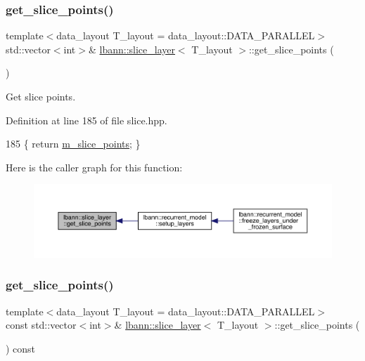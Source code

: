 \subsubsection{\texorpdfstring{get\+\_\+slice\+\_\+points()}{get\_slice\_points()}\hspace{0.1cm}{\footnotesize\ttfamily [1/2]}}
{\footnotesize\ttfamily template$<$data\+\_\+layout T\+\_\+layout = data\+\_\+layout\+::\+D\+A\+T\+A\+\_\+\+P\+A\+R\+A\+L\+L\+EL$>$ \\
std\+::vector$<$int$>$\& \hyperlink{classlbann_1_1slice__layer}{lbann\+::slice\+\_\+layer}$<$ T\+\_\+layout $>$\+::get\+\_\+slice\+\_\+points (\begin{DoxyParamCaption}{ }\end{DoxyParamCaption})\hspace{0.3cm}{\ttfamily [inline]}}

Get slice points. 

Definition at line 185 of file slice.\+hpp.


\begin{DoxyCode}
185 \{ \textcolor{keywordflow}{return} \hyperlink{classlbann_1_1slice__layer_af79dab13a70da2e81209e7ae15166e30}{m\_slice\_points}; \}
\end{DoxyCode}
Here is the caller graph for this function\+:\nopagebreak
\begin{figure}[H]
\begin{center}
\leavevmode
\includegraphics[width=350pt]{classlbann_1_1slice__layer_a5c02b2a15355be051f93e72f3b2803ce_icgraph}
\end{center}
\end{figure}
\mbox{\label{classlbann_1_1slice__layer_a88936fbabd04b06be6cf732fc5b73317}} 
\subsubsection{\texorpdfstring{get\+\_\+slice\+\_\+points()}{get\_slice\_points()}\hspace{0.1cm}{\footnotesize\ttfamily [2/2]}}
{\footnotesize\ttfamily template$<$data\+\_\+layout T\+\_\+layout = data\+\_\+layout\+::\+D\+A\+T\+A\+\_\+\+P\+A\+R\+A\+L\+L\+EL$>$ \\
const std\+::vector$<$int$>$\& \hyperlink{classlbann_1_1slice__layer}{lbann\+::slice\+\_\+layer}$<$ T\+\_\+layout $>$\+::get\+\_\+slice\+\_\+points (\begin{DoxyParamCaption}{ }\end{DoxyParamCaption}) const\hspace{0.3cm}{\ttfamily [inline]}}

